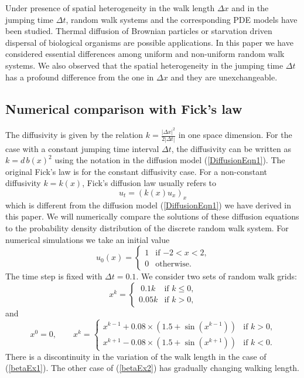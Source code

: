 \documentclass[11pt]{amsart}
\def\d{d}
\begin{document}
Under presence of spatial heterogeneity in the walk length $\Delta x$ and in the jumping time $\Delta t$, random walk systems and the corresponding PDE models have been studied. Thermal diffusion of Brownian particles or starvation driven dispersal of biological organisms are possible applications. In this paper we have considered essential differences among uniform and non-uniform random walk systems. We also observed that the spatial heterogeneity in the jumping time $\Delta t$ has a profound difference from the one in $\Delta x$ and they are unexchangeable.

\subsection{Numerical comparison with Fick's law}

The diffusivity is given by the relation $k=\frac{|\Delta x|^2}{2|\Delta t|}$ in one space dimension. For the case with a constant jumping time interval $\Delta t$, the diffusivity can be written as $k=\d\,b(x)^2$ using the notation in the diffusion model (\ref{DiffusionEqn1}). The original Fick's law \cite{Fick1855} is for the constant diffusivity case. For a non-constant diffusivity $k=k(x)$, Fick's diffusion law usually refers to
\begin{equation}\label{FicksLaw}
u_t=(k(x) u_x)_x
\end{equation}
which is different from the diffusion model (\ref{DiffusionEqn1}) we have derived in this paper. We will numerically compare the solutions of these diffusion equations to the probability density distribution of the discrete random walk system. For numerical simulations we take an initial value
\[
u_0(x)=
\begin{cases}
1 & \text{if $-2<x<2$,}\\
0 & \text{otherwise.}
\end{cases}
\]
The time step is fixed with $\Delta t=0.1$. We consider two sets of random walk grids:
\begin{equation}\label{betaEx1}
x^k=
\begin{cases}
~0.1k & \text{if $k\le0$,}\\
0.05k & \text{if $k>0$,}
\end{cases}
\end{equation}
and
\begin{equation}\label{betaEx2}
x^0=0,\qquad
x^k=
\begin{cases}
x^{k-1}+0.08\times(1.5+\sin(x^{k-1})) & \text{if $k>0$,}\\
x^{k+1}-0.08\times(1.5+\sin(x^{k+1})) & \text{if $k<0$.}
\end{cases}
\end{equation}
There is a discontinuity in the variation of the walk length in the case of (\ref{betaEx1}). The other case of (\ref{betaEx2}) has gradually changing walking length.
\end{document}
